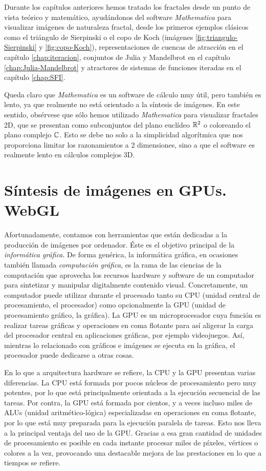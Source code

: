 %
%

Durante los capítulos anteriores hemos tratado los fractales desde un punto de vista teórico y matemático, ayudándonos del software \textit{Mathematica} para visualizar imágenes de naturaleza fractal, desde los primeros ejemplos clásicos como el triángulo de Sierpinski o el copo de Koch (imágenes \ref{fig:triangulo-Sierpinski} y \ref{fig:copo-Koch}), representaciones de cuencas de atracción en el capítulo \ref{chap:iteracion}, conjuntos de Julia y Mandelbrot en el capítulo \ref{chap:Julia-Mandelbrot} y atractores de sistemas de funciones iteradas en el capítulo \ref{chap:SFI}.

Queda claro que \textit{Mathematica} es un software de cálculo muy útil, pero también es lento, ya que realmente no está orientado a la síntesis de imágenes. En este sentido, obsérvese que sólo hemos utilizado \textit{Mathematica} para visualizar fractales 2D, que se presentan como subconjuntos del plano euclídeo $\mathbb{R}^2$ o coloreando el plano complejo $\mathbb{C}$. Esto se debe no solo a la simplicidad algorítmica que nos proporciona limitar los razonamientos a 2 dimensiones, sino a que el software es realmente lento en cálculos complejos 3D.

\section{Síntesis de imágenes en GPUs. WebGL}

Afortunadamente, contamos con herramientas que están dedicadas a la producción de imágenes por ordenador. Éste es el objetivo principal de la \textit{informática gráfica}. De forma genérica, la informática gráfica, en ocasiones también llamada \textit{computación gráfica}, es la rama de las ciencias de la computación que aprovecha los recursos hardware y software de un computador para sintetizar y manipular digitalmente contenido visual. Concretamente, un computador puede utilizar durante el procesado tanto su CPU (unidad central de procesamiento, el procesador) como opcionalmente la GPU (unidad de procesamiento gráfico, la gráfica). La GPU es un microprocesador cuya función es realizar tareas gráficas y operaciones en coma flotante para así aligerar la carga del procesador central en aplicaciones gráficas, por ejemplo videojuegos. Así, mientras lo relacionado con gráficos e imágenes se ejecuta en la gráfica, el procesador puede dedicarse a otras cosas.

En lo que a arquitectura hardware se refiere, la CPU y la GPU presentan varias diferencias. La CPU está formada por pocos núcleos de procesamiento pero muy potentes, por lo que está principalmente orientada a la ejecución secuencial de las tareas. Por contra, la GPU está formada por cientos, y a veces incluso miles de ALUs (unidad aritmético-lógica) especializadas en operaciones en coma flotante, por lo que está muy preparada para la ejecución paralela de tareas. Esto nos lleva a la principal ventaja del uso de la GPU. Gracias a esa gran cantidad de unidades de procesamiento es posible en cada instante procesar miles de píxeles, vértices o colores a la vez, provocando una destacable mejora de las prestaciones en lo que a tiempos se refiere.

